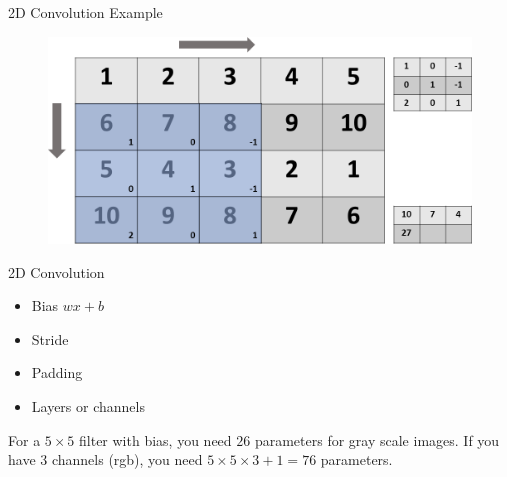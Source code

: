 \begin{frame}{2D Convolution Example}
	\begin{figure}
		\includegraphics[width=.7\textwidth, center]{figures/conv-slide5-cropped}
	\end{figure}
\end{frame}

\begin{frame}{2D Convolution} 
	\begin{itemize}
		\item Bias $wx+b$ 
		\item Stride 
		\item Padding 
		\item Layers or channels 
	\end{itemize}
	For a $5\times5$ filter with bias, you need $26$ parameters for gray scale images. 
	If you have 3 channels (rgb), you need $5\times 5\times 3+1=76$ parameters. 
\end{frame}

